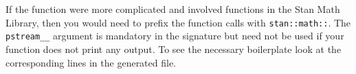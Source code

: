 If the function were more complicated and involved functions
in the Stan Math Library, then you would need to prefix the
function calls with {\tt stan::math::}. The {\tt pstream\_\_}
argument is mandatory in the signature but need not be used
if your function does not print any output. To see the 
necessary boilerplate look at the corresponding lines in the
generated \Cpp file.
